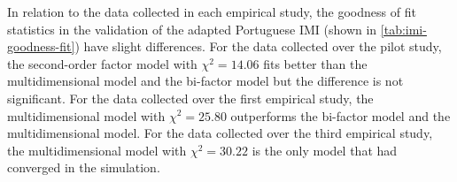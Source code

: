 In relation to the data collected in each empirical study, the goodness of fit statistics in the validation of the adapted Portuguese IMI (shown in \autoref{tab:imi-goodness-fit}) have slight differences. For the data collected over the pilot study, the second-order factor model with ${\chi}^2=14.06$ fits better than the multidimensional model and the bi-factor model but the difference is not significant. For the data collected over the first empirical study, the multidimensional model with ${\chi}^2=25.80$ outperforms the bi-factor model and the multidimensional model. For the data collected over the third empirical study, the multidimensional model with ${\chi}^2=30.22$ is the only model that had converged in the simulation.

